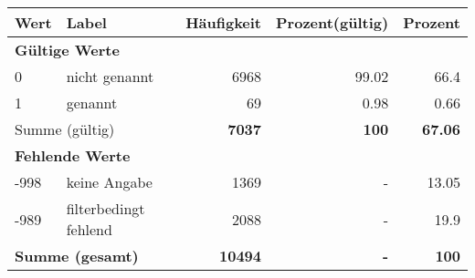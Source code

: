      \begin{longtable}{lXrrr}
     \toprule
     \textbf{Wert} & \textbf{Label} & \textbf{Häufigkeit} & \textbf{Prozent(gültig)} & \textbf{Prozent} \\
     \endhead
     \midrule
     \multicolumn{5}{l}{\textbf{Gültige Werte}}\\

     0 &
     \multicolumn{1}{X}{ nicht genannt   } &


       \num{6968} &
       \num[round-mode=places,round-precision=2]{99.02} &
         \num[round-mode=places,round-precision=2]{66.4} \\

     1 &
     \multicolumn{1}{X}{ genannt   } &


       \num{69} &
       \num[round-mode=places,round-precision=2]{0.98} &
         \num[round-mode=places,round-precision=2]{0.66} \\
     \midrule
     \multicolumn{2}{l}{Summe (gültig)} &
       \textbf{\num{7037}} &
     \textbf{\num{100}} &
       \textbf{\num[round-mode=places,round-precision=2]{67.06}} \\
     \multicolumn{5}{l}{\textbf{Fehlende Werte}}\\
       -998 &
       keine Angabe &
         \num{1369} &
        - &
         \num[round-mode=places,round-precision=2]{13.05} \\
       -989 &
       filterbedingt fehlend &
         \num{2088} &
        - &
         \num[round-mode=places,round-precision=2]{19.9} \\
     \midrule
     \multicolumn{2}{l}{\textbf{Summe (gesamt)}} &
          \textbf{\num{10494}} &
        \textbf{-} &
        \textbf{\num{100}} \\
     \bottomrule
     \end{longtable}
     
